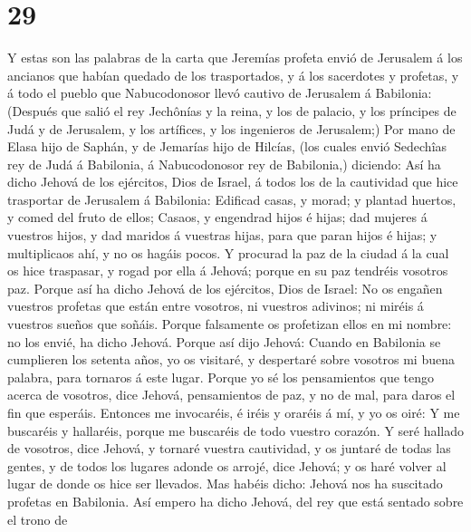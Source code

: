 \hypertarget{section-28}{%
\section{29}\label{section-28}}

 Y estas son las palabras de la carta que Jeremías profeta
envió de Jerusalem á los ancianos que habían quedado de los
trasportados, y á los sacerdotes y profetas, y á todo el pueblo que
Nabucodonosor llevó cautivo de Jerusalem á Babilonia: 
(Después que salió el rey Jechônías y la reina, y los de palacio, y los
príncipes de Judá y de Jerusalem, y los artífices, y los ingenieros de
Jerusalem;)  Por mano de Elasa hijo de Saphán, y de
Jemarías hijo de Hilcías, (los cuales envió Sedechîas rey de Judá á
Babilonia, á Nabucodonosor rey de Babilonia,) diciendo: 
Así ha dicho Jehová de los ejércitos, Dios de Israel, á todos los de la
cautividad que hice trasportar de Jerusalem á Babilonia: 
Edificad casas, y morad; y plantad huertos, y comed del fruto de ellos;
 Casaos, y engendrad hijos é hijas; dad mujeres á vuestros
hijos, y dad maridos á vuestras hijas, para que paran hijos é hijas; y
multiplicaos ahí, y no os hagáis pocos.  Y procurad la paz
de la ciudad á la cual os hice traspasar, y rogad por ella á Jehová;
porque en su paz tendréis vosotros paz.  Porque así ha
dicho Jehová de los ejércitos, Dios de Israel: No os engañen vuestros
profetas que están entre vosotros, ni vuestros adivinos; ni miréis á
vuestros sueños que soñáis.  Porque falsamente os
profetizan ellos en mi nombre: no los envié, ha dicho Jehová.
 Porque así dijo Jehová: Cuando en Babilonia se
cumplieren los setenta años, yo os visitaré, y despertaré sobre vosotros
mi buena palabra, para tornaros á este lugar.  Porque yo
sé los pensamientos que tengo acerca de vosotros, dice Jehová,
pensamientos de paz, y no de mal, para daros el fin que esperáis.
 Entonces me invocaréis, é iréis y oraréis á mí, y yo os
oiré:  Y me buscaréis y hallaréis, porque me buscaréis de
todo vuestro corazón.  Y seré hallado de vosotros, dice
Jehová, y tornaré vuestra cautividad, y os juntaré de todas las gentes,
y de todos los lugares adonde os arrojé, dice Jehová; y os haré volver
al lugar de donde os hice ser llevados.  Mas habéis
dicho: Jehová nos ha suscitado profetas en Babilonia. 
Así empero ha dicho Jehová, del rey que está sentado sobre el trono de
